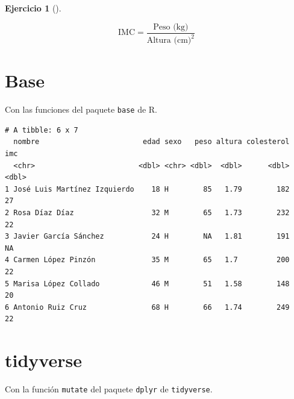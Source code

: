 \documentclass[
  a4paper,
]{scrreport}
\newenvironment{Shaded}{\begin{snugshade}}{\end{snugshade}}
\newcommand{\DecValTok}[1]{\textcolor[rgb]{0.68,0.00,0.00}{#1}}
\newcommand{\FunctionTok}[1]{\textcolor[rgb]{0.28,0.35,0.67}{#1}}
\newcommand{\NormalTok}[1]{\textcolor[rgb]{0.00,0.23,0.31}{#1}}
\newcommand{\OtherTok}[1]{\textcolor[rgb]{0.00,0.23,0.31}{#1}}
\newcommand{\SpecialCharTok}[1]{\textcolor[rgb]{0.37,0.37,0.37}{#1}}
\theoremstyle{definition}
\newtheorem{exercise}{Ejercicio}[chapter]
\theoremstyle{remark}
\begin{document}
\begin{exercise}[]
\begin{enumerate}
  \[
  \mbox{IMC} = \frac{\mbox{Peso (kg)}}{\mbox{Altura (cm)}^2}
  \]

  \begin{tcolorbox}[enhanced jigsaw, breakable, toptitle=1mm, colbacktitle=quarto-callout-tip-color!10!white, rightrule=.15mm, opacityback=0, opacitybacktitle=0.6, titlerule=0mm, coltitle=black, colframe=quarto-callout-tip-color-frame, colback=white, bottomtitle=1mm, leftrule=.75mm, toprule=.15mm, title=\textcolor{quarto-callout-tip-color}{\faLightbulb}\hspace{0.5em}{Solución}, arc=.35mm, bottomrule=.15mm, left=2mm]

  \section{Base}

  Con las funciones del paquete \texttt{base} de R.

\begin{Shaded}
\end{Shaded}

\begin{verbatim}
# A tibble: 6 x 7
  nombre                        edad sexo   peso altura colesterol   imc
  <chr>                        <dbl> <chr> <dbl>  <dbl>      <dbl> <dbl>
1 José Luis Martínez Izquierdo    18 H        85   1.79        182    27
2 Rosa Díaz Díaz                  32 M        65   1.73        232    22
3 Javier García Sánchez           24 H        NA   1.81        191    NA
4 Carmen López Pinzón             35 M        65   1.7         200    22
5 Marisa López Collado            46 M        51   1.58        148    20
6 Antonio Ruiz Cruz               68 H        66   1.74        249    22
\end{verbatim}

  \section{tidyverse}

  Con la función \texttt{mutate} del paquete \texttt{dplyr} de
  \texttt{tidyverse}.


\end{tcolorbox}
\end{enumerate}
\end{exercise}
\end{document}
